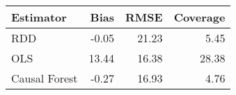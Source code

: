 \begin{table}[ht]
\centering
\begin{tabular}{lrrr}
  \hline
Estimator & Bias & RMSE & Coverage \\ 
  \hline
RDD & -0.05 & 21.23 & 5.45 \\ 
  OLS & 13.44 & 16.38 & 28.38 \\ 
  Causal Forest & -0.27 & 16.93 & 4.76 \\ 
   \hline
\end{tabular}
\caption{} 
\end{table}
